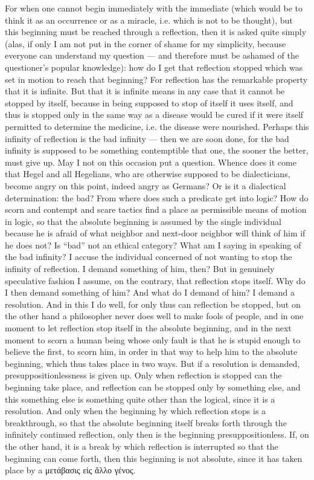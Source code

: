 \documentclass[12pt,a4paper,openany]{book}
\newcommand{\opage}[1]{\marginnote{\footnotesize\textit{[#1]}}}
\begin{document}
For when one cannot begin immediately with the immediate (which would be to think it
as an occurrence or as a miracle, i.e. which is not to be thought), but this
beginning must be reached through a reflection, then it is asked quite simply (alas,
if only I am not put in the corner of shame for my simplicity, because everyone can
understand my question --- and therefore must be ashamed of the questioner's popular
knowledge): how do I get that reflection stopped which was set in motion to reach
that beginning? For reflection has the remarkable property that it is infinite. But
that it is infinite means in any case that it cannot be stopped by itself, because in
being supposed to stop of itself it uses itself, and thus is stopped only in the same
way as a disease would be cured if it were itself permitted to determine the
medicine,
\setcounter{footnote}{0}%
\opage{174}i.e. the disease were nourished. Perhaps this infinity of reflection is the bad
infinity --- then we are soon done, for the bad infinity is supposed to be something
contemptible that one, the sooner the better, must give up. May I not on this occasion
put a question. Whence does it come that Hegel and all Hegelians, who are otherwise
supposed to be dialecticians, become angry on this point, indeed angry as Germans?
Or is it a dialectical determination: the bad? From where does such a predicate get
into logic? How do scorn and contempt and scare tactics find a place as permissible
means of motion in logic, so that the absolute beginning is assumed by the single
individual because he is afraid of what neighbor and next-door neighbor will think
of him if he does not? Is ``bad'' not an ethical category? What am I saying in
speaking of the bad infinity? I accuse the individual concerned of not wanting to stop
the infinity of reflection. I demand something of him, then? But in genuinely
speculative fashion I assume, on the contrary, that reflection stops itself. Why do I
then demand something of him? And what do I demand of him? I demand a resolution. And
in this I do well, for only thus can reflection be stopped, but on the other hand a
philosopher never does well to make fools of people, and in one moment to let
reflection stop itself in the absolute beginning, and in the next moment to scorn a
human being whose only fault is that he is stupid enough to believe the first, to
scorn him, in order in that way to help him to the absolute beginning, which thus
takes place in two ways. But if a resolution is demanded, presuppositionlessness is
given up. Only when reflection is stopped can the beginning take place, and
reflection can be stopped only by something else, and this something else is
something quite other than the logical, since it is a resolution. And only when the
beginning by which reflection stops is a breakthrough, so that the absolute beginning
itself breaks forth through the infinitely continued reflection, only then is the
beginning presuppositionless. If, on the other hand, it is a break by which
reflection is interrupted so that the
\setcounter{footnote}{0}%
\opage{175}beginning can come forth, then this beginning is not absolute, since it has taken
place by a μετάβασις εἰς ἄλλο γένος.
\end{document}
